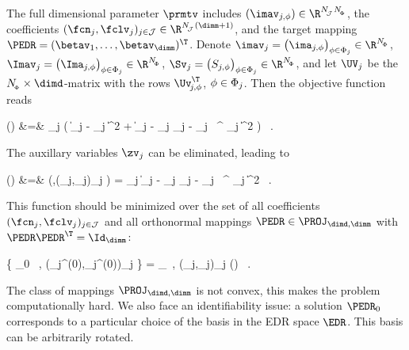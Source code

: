 The full dimensional parameter \( \prmtv \) includes
\( (\imav_{j,\sph}) \in \R^{\nJJJ \nSph} \), 
the coefficients \( (\fcn_{j},\fclv_{j})_{j \in \JJJ} \in \R^{\nJJJ(\dimm+1)} \),
and the target mapping \( \PEDR = (\betav_{1},\ldots,\betav_{\dimm})^{\T} \).
Denote \( \imav_{j} = \bigl( \ima_{j,\sph} \bigr)_{\sph \in \Sph_{j}} \in \R^{\nSph} \), 
\( \Imav_{j} = \bigl( \Ima_{j,\sph} \bigr)_{\sph \in \Sph_{j}} \in \R^{\nSph} \),
\( \Sv_{j} = \bigl( S_{j,\sph} \bigr)_{\sph \in \Sph_{j}} \in \R^{\nSph} \),
and let \( \UV_{j} \) be the \( \nSph \times \dimd \)-matrix with the rows \( \Uv_{\jm,\sph}^{\T} \),
\( \phi \in \Phi_{j} \).
Then the objective function reads
\begin{EQA}
	\LL(\prmtv)
	&=&
	 \sum_{j \in \JJJ} \Bigl( \| \Imav_{j} - \imav_{j} \|^{2} 
		+ \bigl\| \imav_{j} - \fcn_{j} \Sv_{j} - \UV_{j} \, \PEDR^{\T} \fclv_{j} \bigr\|^{2} \Bigr) 
	\, .
	\qquad
\end{EQA}
The auxillary variables \( \zv_{j} \) can be eliminated, leading to
\begin{EQA}[rcl]
	\LL(\prmtv)
	&=&
	\LL(\PEDR,(\fcn_{j},\fclv_{j})_{j \in \JJJ})
	=
	 \sum_{j \in \JJJ} \bigl\| \Imav_{j} - \fcn_{j} \Sv_{j} - \UV_{j} \, \PEDR^{\T} \fclv_{j} \bigr\|^{2}	
	\, .
	\qquad
\label{gtgyuy6ew5dtde32322jtmiG0}	
\end{EQA}
This function should be minimized over the set of all coefficients \( (\fcn_{j},\fclv_{j})_{j \in \JJJ} \) and all
orthonormal mappings \( \PEDR \in \PROJ_{\dimd,\dimm} \) with \( \PEDR \PEDR^{\T} = \Id_{\dimm} \):
\begin{EQA}[c]
	\{ \PEDR_{0} \, , (\fcn_{j}^{(0)},\fclv_{j}^{(0)})_{j \in \JJJ} \} 
	=
	\arginf_{\PEDR \, , (\fcn_{j},\fclv_{j})_{j \in \JJJ}} \LL(\prmtv)
	\, .
\label{ju7fudeju74334fhfd}
\end{EQA}
The class of mappings \( \PROJ_{\dimd,\dimm} \) is not convex, this makes the problem computationally hard.
We also face an identifiability issue: a solution \( \PEDR_{0} \) corresponds to 
a particular choice of the basis in the EDR space \( \EDR \).
This basis can be arbitrarily rotated.

